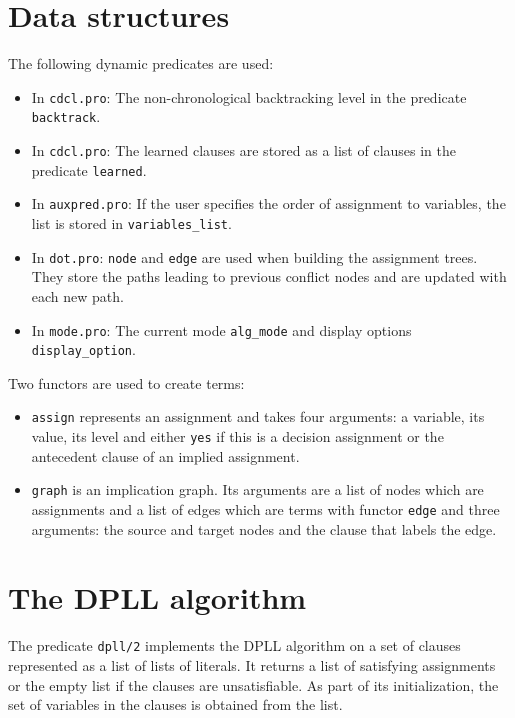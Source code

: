 \documentclass[11pt]{article}
\newcommand*{\p}[1]{\textup{\texttt{#1}}}
\begin{document}
\section{Data structures}

The following dynamic predicates are used:
\begin{itemize}
\item In \p{cdcl.pro}: The non-chronological backtracking level in the
predicate \p{backtrack}.

\item In \p{cdcl.pro}: The learned clauses are stored as a list of
clauses in the predicate \p{learned}.

\item In \p{auxpred.pro}: If the user specifies the order of assignment
to variables, the list is stored in \p{variables\_list}.

\item In \p{dot.pro}: \p{node} and \p{edge} are used when building the
assignment trees. They store the paths leading to previous conflict
nodes and are updated with each new path.

\item In \p{mode.pro}: The current mode \p{alg\_mode} and display
options \p{display\_option}. 

\end{itemize}

\newpage

Two functors are used to create terms:
\begin{itemize}

\item \p{assign} represents an assignment and takes four arguments: a
variable, its value, its level and either \p{yes} if this is a decision
assignment or the antecedent clause of an implied assignment.

\item \p{graph} is an implication graph. Its arguments are a list of
nodes which are assignments and a list of edges which are terms with
functor \p{edge} and three arguments: the source and target nodes
and the clause that labels the edge.
\end{itemize}


\section{The DPLL algorithm}

The predicate \p{dpll/2} implements the DPLL algorithm on a set of
clauses represented as a list of lists of literals. It returns a list of
satisfying assignments or the empty list if the clauses are
unsatisfiable. As part of its initialization, the set of variables in
the clauses is obtained from the list.
\end{document}
